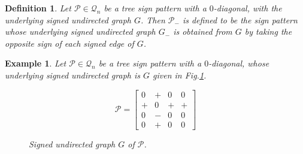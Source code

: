 \documentclass[a4paper, 10pt]{article}
\newtheorem{definition}{Definition}[section]
\newtheorem{eg}{Example}[section]
\numberwithin{equation}{section}
\begin{document}
	
	
	
	\begin{definition}
		Let $\mathcal{P}\in \mathcal{Q}_n$ be a tree sign pattern with a $0$-diagonal, with the underlying signed undirected graph $G$. Then $\mathcal{P}_-$ is defined to be the sign pattern whose underlying signed undirected graph $G_-$ is obtained from $G$ by taking the opposite sign of each signed edge of $G$.
	\end{definition}
	
	\begin{eg} Let $\mathcal{P}\in \mathcal{Q}_n$ be a tree sign pattern with a $0$-diagonal, whose underlying signed undirected graph is $G$  given in Fig.\ref{figx1}.
		\begin{figure}[H]
			\centering
			\begin{minipage}{.45\textwidth}
				\vspace{-1cm}
				\[
				\mathcal{P}=\begin{bmatrix}
					0 & + & 0 & 0 \\
					+ & 0 & + & + \\
					0 & - & 0 & 0 \\
					0 & + & 0 & 0
				\end{bmatrix}
				\]
			\end{minipage}
			\hspace{0.05\textwidth}
			\begin{minipage}{.45\textwidth}
				\centering
				\tikzset{node distance=1cm}
				\caption{Signed undirected graph $ G$ of $\mathcal{P}$.}
				\label{figx1}
			\end{minipage}
		\end{figure}
		
		
		

\end{eg}
\end{document}
